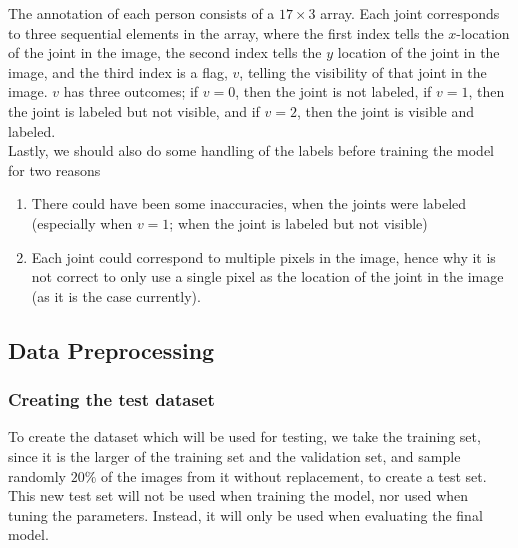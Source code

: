 \documentclass[main.tex]{subfiles}
\begin{document}
The annotation of each person consists of a $17 \times 3$ array. Each joint corresponds to three sequential elements in the array, where the first index tells the $x$-location of the joint in the image, the second index tells the $y$ location of the joint in the image, and the third index is a flag, $v$, telling the visibility of that joint in the image. $v$ has three outcomes; if $v = 0$, then the joint is not labeled, if $v = 1$, then the joint is labeled but not visible, and if $v = 2$, then the joint is visible and labeled. \\
Lastly, we should also do some handling of the labels before training the model for two reasons
\begin{enumerate}
    \item There could have been some inaccuracies, when the joints were labeled (especially when $v = 1$; when the joint is labeled but not visible)
    \item Each joint could correspond to multiple pixels in the image, hence why it is not correct to only use a single pixel as the location of the joint in the image (as it is the case currently).
\end{enumerate}

\subsection{Data Preprocessing}
\subsubsection{Creating the test dataset}
To create the dataset which will be used for testing, we take the training set, since it is the larger of the training set and the validation set, and sample randomly $20 \%$ of the images from it without replacement, to create a test set. This new test set will not be used when training the model, nor used when tuning the parameters. Instead, it will only be used when evaluating the final model. 
\end{document}
